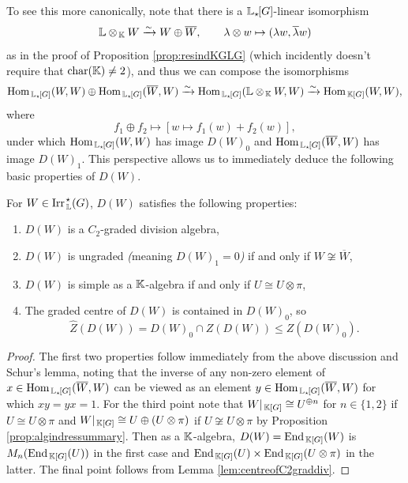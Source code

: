 To see this more canonically, note that there is a ${\mathbb L}_{\star \hspace{-0.1em}}[G]$-linear isomorphism
\[
{\mathbb L} \otimes_{\, {\mathbb K}} W \xrightarrow{\sim} W \oplus \overline{W}, \qquad \lambda \otimes w \mapsto (\lambda w, \overline{\lambda}w)
\]
as in the proof of Proposition \ref{prop:resindKGLG} (which incidently doesn't require that $\operatorname{char}({\mathbb K}) \neq 2$), and thus we can compose the isomorphisms
\begin{align*}
\operatorname{Hom}_{\, {\mathbb L}_{\star \hspace{-0.1em}}[G]}(W,W) \oplus \operatorname{Hom}_{\, {\mathbb L}_{\star \hspace{-0.1em}}[G]}(\overline{W},W) \xrightarrow{\sim} \operatorname{Hom}_{\, {\mathbb L}_{\star \hspace{-0.1em}}[G]}({\mathbb L} \otimes_{\, {\mathbb K}} W , W) \xrightarrow{\sim} \operatorname{Hom}_{\, {\mathbb K}[G]}(W,W),
\end{align*}
where
\[
f_1 \oplus f_2 \mapsto [w \mapsto f_1(w) + f_2(w)],
\]
under which $\operatorname{Hom}_{\, {\mathbb L}_{\star \hspace{-0.1em}}[G]}(W,W)$ has image $D(W)_0$ and $\operatorname{Hom}_{\, {\mathbb L}_{\star \hspace{-0.1em}}[G]}(\overline{W},W)$ has image $D(W)_1$. This perspective allows us to immediately deduce the following basic properties of $D(W)$.

\begin{prop}\label{prop:basicpropDW}
    For $W \in \operatorname{Irr}_{\, {\mathbb L}}^{\hspace{0.1em} \star}(G)$, $D(W)$ satisfies the following properties:
    \begin{enumerate}
        \item $D(W)$ is a $C_2$-graded division algebra,
        \item $D(W)$ is ungraded \emph{(}meaning $D(W)_1 = 0$\emph{)} if and only if $W \not\cong \overline{W}$,
        \item $D(W)$ is simple as a ${\mathbb K}$-algebra if and only if $U \cong U \otimes \pi$,
        \item The graded centre of $D(W)$ is contained in $D(W)_0$, so
        \[
            \widehat{Z}(D(W)) = D(W)_0 \cap Z(D(W)) \leq Z(D(W)_0).
        \] 
    \end{enumerate}
\end{prop}

\begin{proof}
    The first two properties follow immediately from the above discussion and Schur's lemma, noting that the inverse of any non-zero element of $x \in \operatorname{Hom}_{\, {\mathbb L}_{\star \hspace{-0.1em}}[G]}(\overline{W},W)$ can be viewed as an element $y \in \operatorname{Hom}_{\, {\mathbb L}_{\star \hspace{-0.1em}}[G]}(\overline{W},W)$ for which $xy = yx = 1$. For the third point note that $W|_{\, {\mathbb K}[G]} \cong U^{\oplus n}$ for $n \in \{1,2\}$ if $U \cong U \otimes \pi$ and $W|_{\, {\mathbb K}[G]} \cong U \oplus (U \otimes \pi)$ if $U \not\cong U \otimes \pi$ by Proposition \ref{prop:algindressummary}. Then as a ${\mathbb K}$-algebra, $D(W) = \operatorname{End}_{\, {\mathbb K}[G]}(W)$ is $M_n(\operatorname{End}_{\, {\mathbb K}[G]}(U))$ in the first case and $\operatorname{End}_{\, {\mathbb K}[G]}(U) \times \operatorname{End}_{\, {\mathbb K}[G]}(U \otimes \pi)$ in the latter. The final point follows from Lemma \ref{lem:centreofC2graddiv}.
\end{proof}

